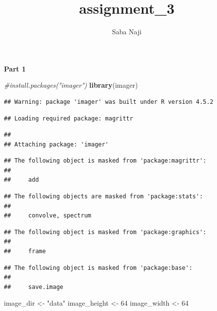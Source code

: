\documentclass[
]{article}
\title{assignment\_3}
\author{Saba Naji}
\date{}
\newenvironment{Shaded}{\begin{snugshade}}{\end{snugshade}}
\newcommand{\CommentTok}[1]{\textcolor[rgb]{0.56,0.35,0.01}{\textit{#1}}}
\newcommand{\DecValTok}[1]{\textcolor[rgb]{0.00,0.00,0.81}{#1}}
\newcommand{\FunctionTok}[1]{\textcolor[rgb]{0.13,0.29,0.53}{\textbf{#1}}}
\newcommand{\NormalTok}[1]{#1}
\newcommand{\OtherTok}[1]{\textcolor[rgb]{0.56,0.35,0.01}{#1}}
\newcommand{\StringTok}[1]{\textcolor[rgb]{0.31,0.60,0.02}{#1}}
\begin{document}
\maketitle

\textbf{Part 1}

\begin{Shaded}
\begin{Highlighting}[]
\CommentTok{\#install.packages("imager")}
\FunctionTok{library}\NormalTok{(imager)}
\end{Highlighting}
\end{Shaded}

\begin{verbatim}
## Warning: package 'imager' was built under R version 4.5.2
\end{verbatim}

\begin{verbatim}
## Loading required package: magrittr
\end{verbatim}

\begin{verbatim}
## 
## Attaching package: 'imager'
\end{verbatim}

\begin{verbatim}
## The following object is masked from 'package:magrittr':
## 
##     add
\end{verbatim}

\begin{verbatim}
## The following objects are masked from 'package:stats':
## 
##     convolve, spectrum
\end{verbatim}

\begin{verbatim}
## The following object is masked from 'package:graphics':
## 
##     frame
\end{verbatim}

\begin{verbatim}
## The following object is masked from 'package:base':
## 
##     save.image
\end{verbatim}

\begin{Shaded}
\begin{Highlighting}[]
\NormalTok{image\_dir }\OtherTok{\textless{}{-}} \StringTok{"data"}
\NormalTok{image\_height }\OtherTok{\textless{}{-}} \DecValTok{64}
\NormalTok{image\_width }\OtherTok{\textless{}{-}} \DecValTok{64}
\end{Highlighting}
\end{Shaded}
\end{document}
